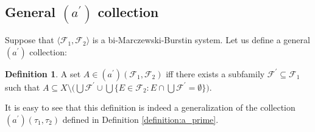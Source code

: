 \documentclass[12pt]{amsart}
\theoremstyle{plain}
\theoremstyle{definition}
\newtheorem{definition}[theorem]{Definition}
\theoremstyle{remark}
\newcommand{\cF}{{\mathcal F}}
\newcommand{\aidealprime}{\mathit{(a^\prime)}}
\newcommand{\biMB}{bi-Marczewski-Burstin}
\begin{document}
\subsection{General $\aidealprime$ collection}

Suppose that $\langle \cF_1, \cF_2 \rangle$ is a \biMB{} system.
Let us define a general $\aidealprime$ collection:

\begin{definition}
A set $A \in \aidealprime(\cF_1, \cF_2)$ iff there exists
a subfamily $\cF^\prime \subseteq \cF_1$ such 
that $A \subseteq X \setminus \big( \bigcup \cF^\prime \cup 
\bigcup \lbrace E \in \cF_2 \colon E \cap \bigcup \cF^\prime = \emptyset \rbrace\big)$.
\end{definition}

  It is easy to see that this definition is indeed a generalization
of the collection $\aidealprime(\tau_1, \tau_2)$ defined in 
Definition \ref{definition:a_prime}.

\end{document}
